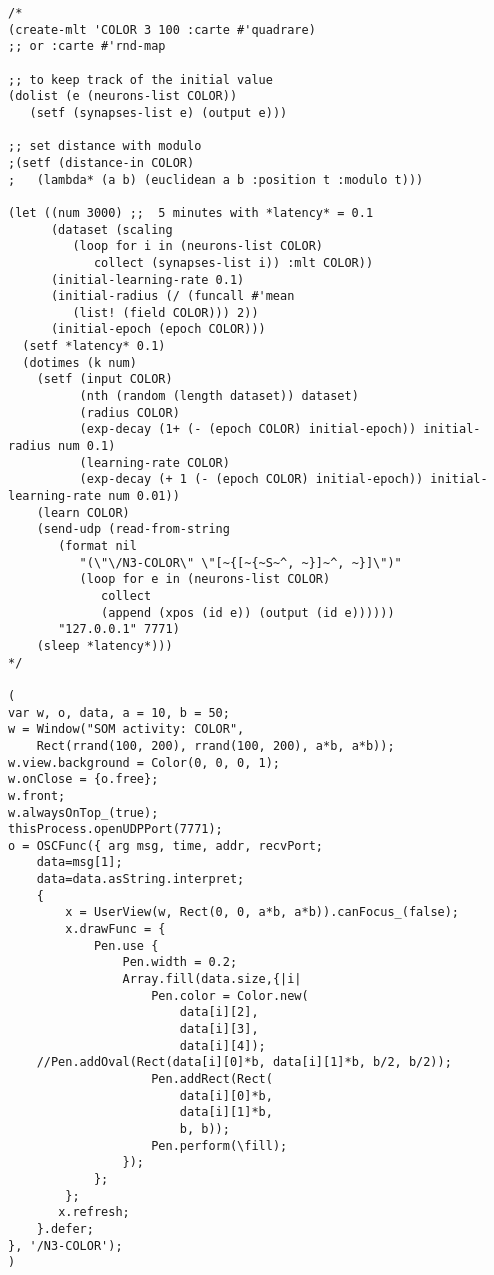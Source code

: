 \begin{lstlisting}[language=SuperCollider]
/*
(create-mlt 'COLOR 3 100 :carte #'quadrare) 
;; or :carte #'rnd-map

;; to keep track of the initial value
(dolist (e (neurons-list COLOR)) 
   (setf (synapses-list e) (output e)))

;; set distance with modulo
;(setf (distance-in COLOR) 
;   (lambda* (a b) (euclidean a b :position t :modulo t)))

(let ((num 3000) ;;  5 minutes with *latency* = 0.1
      (dataset (scaling
         (loop for i in (neurons-list COLOR) 
            collect (synapses-list i)) :mlt COLOR))
      (initial-learning-rate 0.1)
      (initial-radius (/ (funcall #'mean 
         (list! (field COLOR))) 2))
      (initial-epoch (epoch COLOR)))
  (setf *latency* 0.1)
  (dotimes (k num)
    (setf (input COLOR)
          (nth (random (length dataset)) dataset)
          (radius COLOR)
          (exp-decay (1+ (- (epoch COLOR) initial-epoch)) initial-radius num 0.1)
          (learning-rate COLOR)
          (exp-decay (+ 1 (- (epoch COLOR) initial-epoch)) initial-learning-rate num 0.01))
    (learn COLOR)
    (send-udp (read-from-string 
       (format nil 
          "(\"\/N3-COLOR\" \"[~{[~{~S~^, ~}]~^, ~}]\")" 
          (loop for e in (neurons-list COLOR) 
             collect 
             (append (xpos (id e)) (output (id e))))))
       "127.0.0.1" 7771)
    (sleep *latency*)))
*/

(
var w, o, data, a = 10, b = 50;
w = Window("SOM activity: COLOR",
    Rect(rrand(100, 200), rrand(100, 200), a*b, a*b));
w.view.background = Color(0, 0, 0, 1);
w.onClose = {o.free};
w.front;
w.alwaysOnTop_(true);
thisProcess.openUDPPort(7771);
o = OSCFunc({ arg msg, time, addr, recvPort;
    data=msg[1];
    data=data.asString.interpret;
    {
		x = UserView(w, Rect(0, 0, a*b, a*b)).canFocus_(false);
		x.drawFunc = {
			Pen.use {
				Pen.width = 0.2;
				Array.fill(data.size,{|i|
					Pen.color = Color.new(
						data[i][2], 
						data[i][3], 
						data[i][4]);
	//Pen.addOval(Rect(data[i][0]*b, data[i][1]*b, b/2, b/2));
					Pen.addRect(Rect(
						data[i][0]*b, 
						data[i][1]*b, 
						b, b));
					Pen.perform(\fill);
				});
			};
		};
       x.refresh;
    }.defer;
}, '/N3-COLOR');
)
\end{lstlisting}
